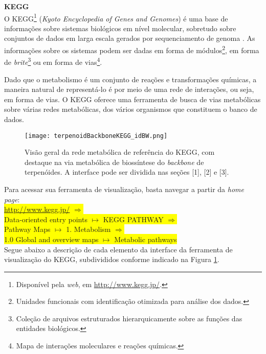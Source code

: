 \textbf{KEGG} \\

\indent O KEGG\footnote{Disponível pela \textit{web}, em \url{http://www.kegg.jp/}.} (\textit{Kyoto Encyclopedia of Genes and Genomes}) é uma base de informações sobre sistemas biológicos em nível molecular, sobretudo sobre conjuntos de dados em larga escala gerados por sequenciamento de genoma \cite{keggOverview}. As informações sobre os sistemas podem ser dadas em forma de módulos\footnote{Unidades funcionais com identificação otimizada para análise dos dados.}, em forma de \textit{brite}\footnote{Coleção de arquivos estruturados hierarquicamente sobre as funções das entidades biológicos.} ou em forma de vias\footnote{Mapa de interações moleculares e reações químicas.}.

\indent Dado que o metabolismo é um conjunto de reações e transformações químicas, a maneira natural de representá-lo é por meio de uma rede de interações, ou seja, em forma de vias. O KEGG oferece uma ferramenta de busca de vias metabólicas sobre várias redes metabólicas, dos vários organismos que constituem o banco de dados.

\begin{figure}[!h]
\centering
\texttt{[image: terpenoidBackboneKEGG\_idBW.png]}
\caption{Visão geral da rede metabólica de referência do KEGG, com destaque na via metabólica de biossíntese do \textit{backbone} de terpenóides. A interface pode ser dividida nas seções [1], [2] e [3].}
\label{terpenoidBackboneKEGG_id}
\end{figure}

\indent Para acessar sua ferramenta de visualização, basta navegar a partir da \textit{home page}: \\

\indent \colorbox{yellow}{\url{http://www.kegg.jp/} $\Rightarrow$} \\
\indent \colorbox{yellow}{Data-oriented entry points  $\mapsto$ KEGG PATHWAY $\Rightarrow$} \\
\indent \colorbox{yellow}{Pathway Maps $\mapsto$ 1. Metabolism  $\Rightarrow$} \\
\indent \colorbox{yellow}{1.0 Global and overview maps $\mapsto$ Metabolic pathways} \\

\indent Segue abaixo a descrição de cada elemento da interface da ferramenta de visualização do KEGG, subdivididos conforme indicado na Figura \ref{terpenoidBackboneKEGG_id}.


